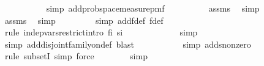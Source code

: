 \begin{isabellebody}
\ \ \ \ \ \ \ \ \ \isamarkupfalse%
\ {\isacharparenleft}{\kern0pt}simp\ add{\isacharcolon}{\kern0pt}prob{\isacharunderscore}{\kern0pt}space{\isacharunderscore}{\kern0pt}measure{\isacharunderscore}{\kern0pt}pmf{\isacharparenright}{\kern0pt}\isanewline
\ \ \ \ \ \ \ \ \isamarkupfalse%
\ assms{\isacharparenleft}{\kern0pt}{}{\isacharparenright}{\kern0pt}\ \isamarkupfalse%
\ simp\isanewline
\ \ \ \ \ \ \ \isamarkupfalse%
\ assms{\isacharparenleft}{\kern0pt}{}{\isacharparenright}{\kern0pt}\ \isamarkupfalse%
\ simp\isanewline
\ \ \ \ \ \ \ \isamarkupfalse%
\ {\isacharparenleft}{\kern0pt}simp\ add{\isacharcolon}{\kern0pt}f{}{\isacharunderscore}{\kern0pt}def\ f{}{\isacharunderscore}{\kern0pt}def{\isacharparenright}{\kern0pt}\isanewline
\ \ \ \ \ \ \ \isamarkupfalse%
\ {\isacharparenleft}{\kern0pt}rule\ indep{\isacharunderscore}{\kern0pt}vars{\isacharunderscore}{\kern0pt}restrict{\isacharunderscore}{\kern0pt}intro{\isacharbrackleft}{\kern0pt}\ f{\isacharequal}{\kern0pt}{\isachardoublequoteopen}{\isasymlambda}i{\isachardot}{\kern0pt}\ {\isacharparenleft}{\kern0pt}{\isacharbraceleft}{\kern0pt}{}{\isachardot}{\kern0pt}{\isachardot}{\kern0pt}{\isacharless}{\kern0pt}si{\isacharbraceright}{\kern0pt}{\isacharparenright}{\kern0pt}{\isachardoublequoteclose}{\isacharbrackright}{\kern0pt}{\isacharparenright}{\kern0pt}\isanewline
\ \ \ \ \ \ \ \ \ \ \ \isamarkupfalse%
\ {\isacharparenleft}{\kern0pt}simp{\isacharparenright}{\kern0pt}\isanewline
\ \ \ \ \ \ \ \ \ \ \isamarkupfalse%
\ {\isacharparenleft}{\kern0pt}simp\ add{\isacharcolon}{\kern0pt}disjoint{\isacharunderscore}{\kern0pt}family{\isacharunderscore}{\kern0pt}on{\isacharunderscore}{\kern0pt}def{\isacharcomma}{\kern0pt}\ blast{\isacharparenright}{\kern0pt}\isanewline
\ \ \ \ \ \ \ \ \ \isamarkupfalse%
\ {\isacharparenleft}{\kern0pt}simp\ add{\isacharcolon}{\kern0pt}s{}{\isacharunderscore}{\kern0pt}nonzero{\isacharparenright}{\kern0pt}\isanewline
\ \ \ \ \ \ \ \ \isamarkupfalse%
\ {\isacharparenleft}{\kern0pt}rule\ subsetI{\isacharcomma}{\kern0pt}\ simp{\isacharcomma}{\kern0pt}\ force{\isacharparenright}{\kern0pt}\isanewline
\ \ \ \ \ \ \ \isamarkupfalse%
{\isacharparenleft}{\kern0pt}simp{\isacharparenright}{\kern0pt}\isanewline

\end{isabellebody}
